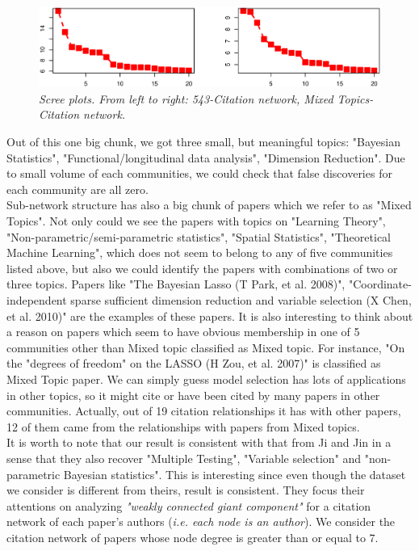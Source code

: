 \documentclass[AMS,STIX1COL]{WileyNJD-v2}
\begin{document}
\begin{figure}[b]
\includegraphics[width=1\textwidth]{Fig4.eps}
\caption{\it Scree plots. From left to right: 543-Citation network, Mixed Topics-Citation network.}
\label{fig:figure4}
\end{figure}

\noindent Out of this one big chunk, we got three small, but meaningful topics: "Bayesian Statistics", "Functional/longitudinal data analysis", "Dimension Reduction". 
Due to small volume of each communities, we could check that false discoveries for each community are all zero.\\

\noindent Sub-network structure has also a big chunk of papers which we refer to as "Mixed Topics". 
Not only could we see the papers with topics on "Learning Theory", "Non-parametric/semi-parametric statistics", "Spatial Statistics", "Theoretical Machine Learning", which does not seem to belong to any of five communities listed above, but also we could identify the papers with combinations of two or three topics. 
Papers like "The Bayesian Lasso (T Park, et al. 2008)", "Coordinate-independent sparse sufficient dimension reduction and variable selection (X Chen, et al. 2010)" are the examples of these papers. 
It is also interesting to think about a reason on papers which seem to have obvious membership in one of 5 communities other than Mixed topic classified as Mixed topic. 
For instance, "On the "degrees of freedom" on the LASSO (H Zou, et al. 2007)" is classified as Mixed Topic paper. 
We can simply guess model selection has lots of applications in other topics, so it might cite or have been cited by many papers in other communities. 
Actually, out of 19 citation relationships it has with other papers, 12 of them came from the relationships with papers from Mixed topics. \\

\noindent It is worth to note that our result is consistent with that from Ji and Jin in a sense that they also recover "Multiple Testing", "Variable selection" and "non-parametric Bayesian statistics". 
This is interesting since even though the dataset we consider is different from theirs, result is consistent. 
They focus their attentions on analyzing {\it "weakly connected giant component"} for a citation network of each paper's authors ({\it i.e. each node is an author}). 
We consider the citation network of papers whose node degree is greater than or equal to 7.\\
\end{document}

